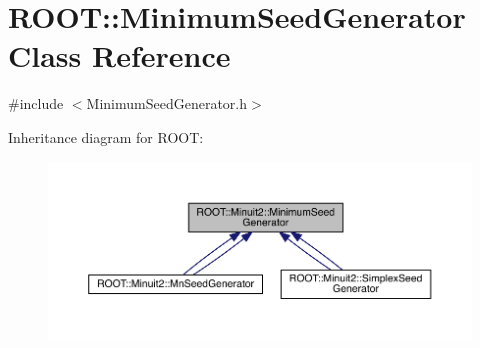 \hypertarget{classROOT_1_1Minuit2_1_1MinimumSeedGenerator}{}\section{R\+O\+OT\+:\+:Minimum\+Seed\+Generator Class Reference}
\label{classROOT_1_1Minuit2_1_1MinimumSeedGenerator}


{\ttfamily \#include $<$Minimum\+Seed\+Generator.\+h$>$}



Inheritance diagram for R\+O\+OT\+:\nopagebreak
\begin{figure}[H]
\begin{center}
\leavevmode
\includegraphics[width=350pt]{d9/d25/classROOT_1_1Minuit2_1_1MinimumSeedGenerator__inherit__graph}
\end{center}
\end{figure}
